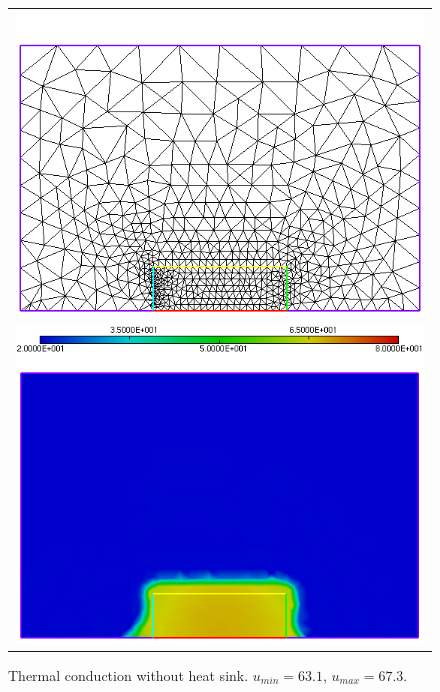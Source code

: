 \begin{figure}[http]
	\centering
	\begin{tabular}{c}
		\includegraphics[width=.8\linewidth]{figures/nosinkc} \\ \includegraphics[width=.8\linewidth]{figures/nosinkb}
	\end{tabular}
	\caption{Thermal conduction without heat sink. $u_{min}=63.1$, $u_{max}=67.3$.}
	\label{fig:nosink}
\end{figure}
